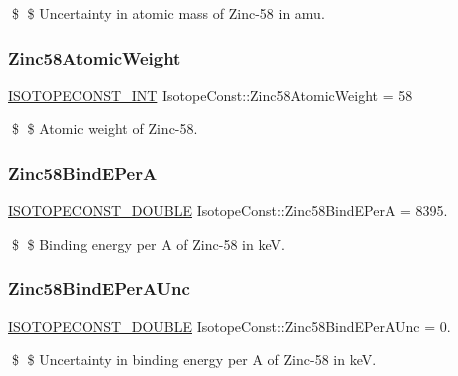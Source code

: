 \$ \$ Uncertainty in atomic mass of Zinc-\/58 in amu. \mbox{\label{group___isotope_const-_zinc-_zn58_gab14e738c0a806187b0858ed8d000faa2}} 
\subsubsection{\texorpdfstring{Zinc58\+Atomic\+Weight}{Zinc58AtomicWeight}}
{\footnotesize\ttfamily \mbox{\hyperlink{group___isotope_const-_macros_ga5f18360b3e99483a35c32d789e62621c}{I\+S\+O\+T\+O\+P\+E\+C\+O\+N\+S\+T\+\_\+\+I\+NT}} Isotope\+Const\+::\+Zinc58\+Atomic\+Weight = 58}

\$ \$ Atomic weight of Zinc-\/58. \mbox{\label{group___isotope_const-_zinc-_zn58_ga5d68ff658bd680d340614a8530008b62}} 
\subsubsection{\texorpdfstring{Zinc58\+Bind\+E\+PerA}{Zinc58BindEPerA}}
{\footnotesize\ttfamily \mbox{\hyperlink{group___isotope_const-_macros_ga8f45a7272ce02c0b4c65c44636ed719a}{I\+S\+O\+T\+O\+P\+E\+C\+O\+N\+S\+T\+\_\+\+D\+O\+U\+B\+LE}} Isotope\+Const\+::\+Zinc58\+Bind\+E\+PerA = 8395.}

\$ \$ Binding energy per A of Zinc-\/58 in keV. \mbox{\label{group___isotope_const-_zinc-_zn58_ga6ab0c662294fa7580362c598140d9985}} 
\subsubsection{\texorpdfstring{Zinc58\+Bind\+E\+Per\+A\+Unc}{Zinc58BindEPerAUnc}}
{\footnotesize\ttfamily \mbox{\hyperlink{group___isotope_const-_macros_ga8f45a7272ce02c0b4c65c44636ed719a}{I\+S\+O\+T\+O\+P\+E\+C\+O\+N\+S\+T\+\_\+\+D\+O\+U\+B\+LE}} Isotope\+Const\+::\+Zinc58\+Bind\+E\+Per\+A\+Unc = 0.}

\$ \$ Uncertainty in binding energy per A of Zinc-\/58 in keV. \mbox{\label{group___isotope_const-_zinc-_zn58_ga2a57e417e32a3fddd055f670b29862fe}} 
